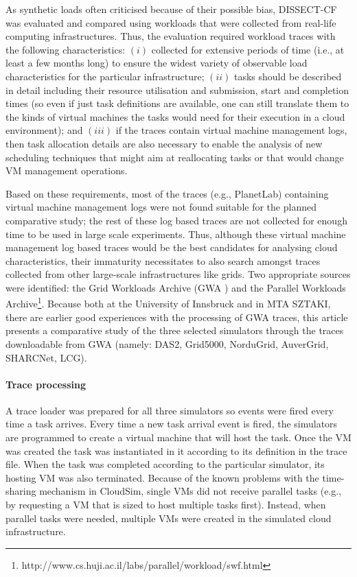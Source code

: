 \documentclass[sort, compress, 5p]{elsarticle}
\begin{document}
As synthetic loads often criticised because of their possible bias, DISSECT-CF was evaluated and compared using workloads that were collected from real-life computing infrastructures. Thus, the evaluation required workload traces with the following characteristics: $(i)$ collected for extensive periods of time (i.e., at least a few months long) to ensure the widest variety of observable load characteristics for the particular infrastructure; $(ii)$ tasks should be described in detail including their resource utilisation and submission, start and completion times (so even if just task definitions are available, one can still translate them to the kinds of virtual machines the tasks would need for their execution in a cloud environment); and $(iii)$ if the traces contain virtual machine management logs, then task allocation details are also necessary to enable the analysis of new scheduling techniques that might aim at reallocating tasks or that would change VM management operations.

Based on these requirements, most of the traces (e.g., PlanetLab) containing virtual machine management logs were not found suitable for the planned comparative study; the rest of these log based traces are not collected for enough time to be used in large scale experiments. Thus, although these virtual machine management log based traces would be the best candidates for analysing cloud characteristics, their immaturity necessitates to also search amongst traces collected from other large-scale infrastructures like grids. Two appropriate sources were identified: the Grid Workloads Archive (GWA \cite{Iosup08thegrid}) and the Parallel Workloads Archive\footnote{http://www.cs.huji.ac.il/labs/parallel/workload/swf.html}. Because both at the University of Innsbruck and in MTA SZTAKI, there are earlier good experiences with the processing of GWA traces, this article presents a comparative study of the three selected simulators through the traces downloadable from GWA (namely: DAS2, Grid5000, NorduGrid, AuverGrid, SHARCNet, LCG). 

\paragraph{Trace processing} A trace loader was prepared for all three simulators so events were fired every time a task arrives. Every time a new task arrival event is fired, the simulators are programmed to create a virtual machine that will host the task. Once the VM was created the task was instantiated in it according to its definition in the trace file. When the task was completed according to the particular simulator, its hosting VM was also terminated. Because of the known problems with the time-sharing mechanism in CloudSim, single VMs did not receive parallel tasks (e.g., by requesting a VM that is sized to host multiple tasks first). Instead, when parallel tasks were needed, multiple VMs were created in the simulated cloud infrastructure.
\end{document}
